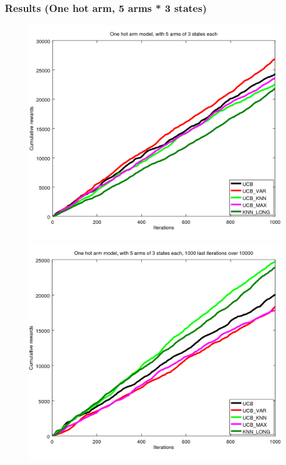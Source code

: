 \documentclass[french]{beamer}
\begin{document}
\begin{frame}
	\frametitle{Results (One hot arm, 5 arms * 3 states)}

	\begin{figure}[h]
		\begin{minipage}[b]{.49\linewidth}
			\includegraphics[width=1.0\textwidth]{begin_s_1000it.png}

		\end{minipage}
		\hfill
		\begin{minipage}[b]{0.49\linewidth}
			\includegraphics[width=1.0\textwidth]{last_s_1000it.png}

		\end{minipage}
		\label{fig:f}
	\end{figure}
\end{frame}
\end{document}
